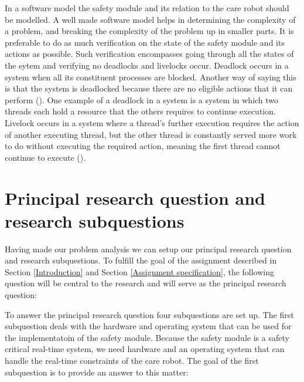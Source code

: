 \documentclass[12pt]{scrreprt}
\begin{document}
In a software model the safety module and its relation to the care robot should be modelled. A well made software model helps in determining the complexity of a problem, and breaking the complexity of the problem up in smaller parts. It is preferable to do as much verification on the state of the safety module and its actions as possible. Such verification encompasses going through all the states of the sytem and verifying no deadlocks and livelocks occur.
Deadlock occurs in a system when all its constituent processes are blocked. Another way of saying this is that the system is deadlocked because there are no eligible actions that it can perform (\cite{ltsa}). One example of a deadlock in a system is a system in which two threads each hold a resource that the others requires to continue execution. Livelock occurs in a system where a thread's further execution requires the action of another executing thread, but the other thread is constantly served more work to do without executing the required action, meaning the first thread cannot continue to execute (\cite{livelock_starvation}).
\par
\par

\section{Principal research question and research subquestions}
\label{Principal research question and research subquestions}
Having made our problem analysis we can setup our principal research question and research subquestions. To fulfill the goal of the assignment described in Section \ref{Introduction} and Section \ref{Assignment specification}, the following question will be central to the research and will serve as the principal research question:

\begin{flushleft}
\textit{\mq}
\end{flushleft}

To answer the principal research question four subquestions are set up. The first subquestion deals with the hardware and operating system that can be used for the implementatoin of the safety module. Because the safety module is a safety critical real-time system, we need hardware and an operating system that can handle the real-time constraints of the care robot. The goal of the first subquestion is to provide an answer to this matter:
\end{document}
